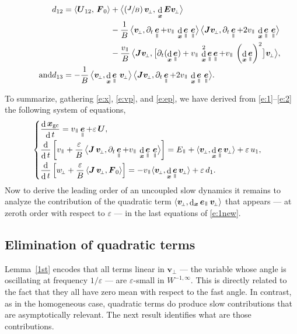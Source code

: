 \documentclass[10pt]{amsart}
\newenvironment{splitcases}
{\begin{cases}\begin{aligned}}
{\end{aligned}\end{cases}}
\newcommand{\sperp}{{\scriptscriptstyle\perp}}
\newcommand{\blangle}{\bigl\langle}
\newcommand{\brangle}{\bigr\rangle}
\newcommand{\Psfrac}[2]{(\sfrac{#1}{#2})}
\let\eps\varepsilon
\let\d\partial
\DeclareMathOperator\dD{d}\let\dd\dD
\theoremstyle{plain}
\theoremstyle{definition}
\newcommand{\be}{\begin{equation}}
\newcommand{\ee}{\end{equation}}
\newcommand\bE{{\boldsymbol E}}
\newcommand\bF{{\boldsymbol F}}
\newcommand\bJ{{\boldsymbol J}}
\newcommand\bU{{\boldsymbol U}}
\newcommand\bfv{{\boldsymbol v}}
\newcommand\bfx{{\boldsymbol x}}
\DeclareMathOperator{\beD}{\boldsymbol{e}}
\newcommand\eDpar{\beD_\mypar}
\newcommand\vpar{v_\mypar}
\newcommand\bvperp{\bfv_{\!\sperp}}
\newcommand\eperp{w_{\!\sperp}}
\newcommand\Epar{E_\mypar}
\newcommand{\GC}{\bfx_\mathrm{gc}}
\newcommand{\mypar}{{\mkern3mu\vphantom{\perp}\vrule depth 0pt\mkern2mu\vrule depth 0pt\mkern3mu}}
\begin{document}
\begin{align*}
d_{12}&=\langle \bU_{12},\,\bF_0\rangle
+
\blangle\Psfrac{\bJ}{B}\,\bvperp,\,\dD_\bfx\bE\bvperp\brangle\\
&\hphantom{{}=\langle \bU_{12},\,\bF_0\rangle}
-\frac{1}{B}\, \blangle \bvperp,\d_t\eDpar+\vpar\,\dD_{\bfx}\eDpar\,\eDpar\brangle\,
\blangle\bJ\bvperp,\d_t\eDpar+2\vpar\,\dD_{\bfx}\eDpar\,\eDpar\brangle
\\
&\hphantom{{}=\langle \bU_{12},\,\bF_0\rangle}
- \frac{\vpar}{B}\, \blangle \bJ\bvperp,
\bigl[\d_t(\dD_\bfx\eDpar)+\vpar\,\dD_{\bfx}^2\eDpar\eDpar+\vpar\,\left(\dD_{\bfx}\eDpar\right)^2\bigr]\bvperp \brangle,\\
\tag*{and}
d_{13}&= -\frac{1}{B} \, \blangle \bvperp, \dD_{\bfx}\eDpar\,\bvperp\brangle\,\blangle
\bJ\bvperp,\d_t\eDpar+2\vpar\,\dD_{\bfx}\eDpar\,\eDpar\brangle.
\end{align*}

To summarize, gathering \eqref{e:x}, \eqref{e:vp}, and \eqref{e:ep}, we have derived from \eqref{e:1}--\eqref{e:2} the following system of equations,
\be
\label{e:1new}
\begin{splitcases}
&\frac{\dD \GC}{\dD t}
= \vpar\eDpar+\eps \,\bU,
\\
&\frac{\dD}{\dD t}\left[\vpar
+\frac{\eps}{B}\,\blangle\bJ\,\bvperp,\d_t\eDpar+\vpar\,\dD_{\bfx}\eDpar\,\eDpar\brangle\right] =\Epar
+\langle\bvperp,\dD_{\bfx}\eDpar\bvperp\rangle
+\eps \,u_1,\\
&\frac{\dD}{\dD t}\left[\eperp + \frac{\eps}{B}\,\langle
{\bJ}\,\bvperp,\bF_0\rangle
\right]=-\vpar\langle\bvperp,\dD_{\bfx}\eDpar\bvperp\rangle+\eps \,d_1.
\end{splitcases}
\ee
Now to derive the leading order of an uncoupled slow dynamics it remains to analyze the contribution of the quadratic term $\langle\bvperp,\dD_{\bfx}\eDpar\bvperp\rangle$ that appears --- at zeroth order with respect to
$\eps$ --- in the last equations of \eqref{e:1new}.

\subsection{Elimination of quadratic terms}
\label{s:quadratic}

Lemma~\ref{1st} encodes that all terms linear in $\bvperp$ --- the variable whose angle is oscillating at frequency $1/\eps$ --- are $\eps$-small in $W^{-1,\infty}$. This is directly related to the fact that they all have zero mean with respect to the fast angle. In contrast, as in the homogeneous case, quadratic terms do produce slow contributions that are asymptotically relevant. The next result identifies what are those contributions.
\end{document}
